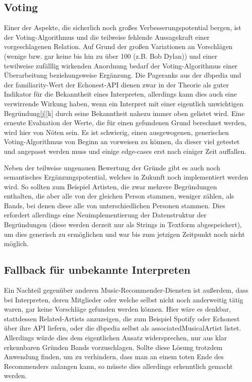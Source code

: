 \subsection{Voting}
Einer der Aspekte, die sicherlich noch großes Verbesserungspotential bergen, ist der Voting-Algorithmus und die teilweise fehlende Aussagekraft einer vorgeschlagenen Relation. Auf Grund der großen Variationen an Vorschlägen (wenige bzw. gar keine bis hin zu über 100 (z.B. Bob Dylan)) und einer tewilweise zufälllig wirkenden Anordnung bedarf der Voting-Algorithmus einer Überarbeitung beziehungsweise Ergänzung. Die Pageranks aus der dbpedia und der familiarity-Wert der Echonest-API dienen zwar in der Theorie als guter Indikator für die Bekanntheit eines Interpreten, allerdings kann dies auch eine verwirrende Wirkung haben, wenn ein Interpret mit einer eigentlich unwichtigen Begründung[j][k] durch seine Bekanntheit nahezu immer oben gelistet wird. Eine erneute Evaluation der Werte, die für einen gefundenen Grund berechnet werden, wird hier von Nöten sein. Es ist schwierig, einen ausgewogenen, generischen Voting-Algorithmus von Beginn an vorweisen zu können, da dieser viel getestet und angepasst werden muss und einige edge-cases erst nach einiger Zeit auffallen.


Neben der teilweise ungenauen Bewertung der Gründe gibt es auch noch semantisches Ergänzungspotential, welches in Zukunft noch implementiert werden wird. So sollten zum Beispiel Artisten, die zwar mehrere Begründungen enthalten, die aber alle von der gleichen Person stammen, weniger zählen, als Bands, bei denen diese alle von unterschiedlichen Personen stammen. Dies erfordert allerdings eine Neuimplementierung der Datenstruktur der  Begründungen (diese werden derzeit nur als Strings in Textform abgespeichert), um dies generisch zu ermöglichen und war bis zum jetzigen Zeitpunkt noch nicht möglich.

\subsection{Fallback für unbekannte Interpreten}
Ein Nachteil gegenüber anderen Music-Recommender-Diensten ist außerdem, dass bei Interpreten, deren Mitglieder oder welche selbst nicht noch anderweitig tätig waren, gar keine Vorschläge gefunden werden können. Hier wäre es denkbar, stattdessen Related-Artists anzuzeigen, die zum Beispiel Spotify oder Echonest über ihre API liefern, oder die dbpedia selbst als associatedMusicalArtist listet. Allerdings würde dies dem eigentlichen Ansatz widersprechen, nur aus klar erkennbaren Gründen Bands vorzuschlagen. Sollte diese Lösung trotzdem Anwendung finden, um zu verhindern, dass man an einem toten Ende des Recommenders anlangen kann, so müsste dies allerdings erkenntlich gemacht werden.

